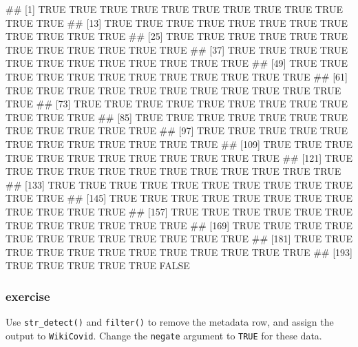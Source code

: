 \documentclass[11pt,]{article}
\newenvironment{Shaded}{\begin{snugshade}}{\end{snugshade}}
\newcommand{\AttributeTok}[1]{\textcolor[rgb]{0.77,0.63,0.00}{#1}}
\newcommand{\FunctionTok}[1]{\textcolor[rgb]{0.00,0.00,0.00}{#1}}
\newcommand{\NormalTok}[1]{#1}
\newcommand{\OtherTok}[1]{\textcolor[rgb]{0.56,0.35,0.01}{#1}}
\newcommand{\SpecialCharTok}[1]{\textcolor[rgb]{0.00,0.00,0.00}{#1}}
\newcommand{\StringTok}[1]{\textcolor[rgb]{0.31,0.60,0.02}{#1}}
\let\oldShaded\Shaded
\let\endoldShaded\endShaded
\renewenvironment{Shaded}{\footnotesize\oldShaded}{\endoldShaded}
\let\oldverbatim\verbatim
\let\endoldverbatim\endverbatim
\renewenvironment{verbatim}{\footnotesize\oldverbatim}{\endoldverbatim}
\begin{document}
\begin{verbatim}
##   [1]  TRUE  TRUE  TRUE  TRUE  TRUE  TRUE  TRUE  TRUE  TRUE  TRUE  TRUE  TRUE
##  [13]  TRUE  TRUE  TRUE  TRUE  TRUE  TRUE  TRUE  TRUE  TRUE  TRUE  TRUE  TRUE
##  [25]  TRUE  TRUE  TRUE  TRUE  TRUE  TRUE  TRUE  TRUE  TRUE  TRUE  TRUE  TRUE
##  [37]  TRUE  TRUE  TRUE  TRUE  TRUE  TRUE  TRUE  TRUE  TRUE  TRUE  TRUE  TRUE
##  [49]  TRUE  TRUE  TRUE  TRUE  TRUE  TRUE  TRUE  TRUE  TRUE  TRUE  TRUE  TRUE
##  [61]  TRUE  TRUE  TRUE  TRUE  TRUE  TRUE  TRUE  TRUE  TRUE  TRUE  TRUE  TRUE
##  [73]  TRUE  TRUE  TRUE  TRUE  TRUE  TRUE  TRUE  TRUE  TRUE  TRUE  TRUE  TRUE
##  [85]  TRUE  TRUE  TRUE  TRUE  TRUE  TRUE  TRUE  TRUE  TRUE  TRUE  TRUE  TRUE
##  [97]  TRUE  TRUE  TRUE  TRUE  TRUE  TRUE  TRUE  TRUE  TRUE  TRUE  TRUE  TRUE
## [109]  TRUE  TRUE  TRUE  TRUE  TRUE  TRUE  TRUE  TRUE  TRUE  TRUE  TRUE  TRUE
## [121]  TRUE  TRUE  TRUE  TRUE  TRUE  TRUE  TRUE  TRUE  TRUE  TRUE  TRUE  TRUE
## [133]  TRUE  TRUE  TRUE  TRUE  TRUE  TRUE  TRUE  TRUE  TRUE  TRUE  TRUE  TRUE
## [145]  TRUE  TRUE  TRUE  TRUE  TRUE  TRUE  TRUE  TRUE  TRUE  TRUE  TRUE  TRUE
## [157]  TRUE  TRUE  TRUE  TRUE  TRUE  TRUE  TRUE  TRUE  TRUE  TRUE  TRUE  TRUE
## [169]  TRUE  TRUE  TRUE  TRUE  TRUE  TRUE  TRUE  TRUE  TRUE  TRUE  TRUE  TRUE
## [181]  TRUE  TRUE  TRUE  TRUE  TRUE  TRUE  TRUE  TRUE  TRUE  TRUE  TRUE  TRUE
## [193]  TRUE  TRUE  TRUE  TRUE  TRUE FALSE
\end{verbatim}

\hypertarget{exercise-1}{%
\subsubsection{exercise}\label{exercise-1}}

Use \texttt{str\_detect()} and \texttt{filter()} to remove the metadata
row, and assign the output to \texttt{WikiCovid}. Change the
\texttt{negate} argument to \texttt{TRUE} for these data.

\begin{Shaded}
\end{Shaded}
\end{document}
